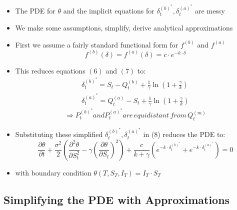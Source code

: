 \documentclass[10pt]{article}
\begin{document}
\begin{itemize} 
    \item The PDE for $\theta$ and the implicit equations for $\delta_{t}^{(b)^{*}}, \delta_{t}^{(a)^{*}}$ are messy
    \item We make some assumptions, simplify, derive analytical approximations
    \item First we assume a fairly standard functional form for $f^{(b)}$ and $f^{(a)}$
    $$
    f^{(b)}(\delta)=f^{(a)}(\delta)=c \cdot e^{-k \cdot \delta}
    $$
    \item This reduces equations $(6)$ and $(7)$ to:
    \[
    \begin{array}{l}
    \delta_{t}^{(b)^{*}}=S_{t}-Q_{t}^{(b)}+\frac{1}{\gamma} \ln \left(1+\frac{\gamma}{k}\right) \tag{11,12} \\
    \delta_{t}^{(a)^{*}}=Q_{t}^{(a)}-S_{t}+\frac{1}{\gamma} \ln \left(1+\frac{\gamma}{k}\right)
    \end{array}
    \]
    $$
    \Rightarrow P_{t}^{(b)^{*}} and P_{t}^{(a)^{*}} are\, equidistant\, from\, Q_{t}^{(m)}
    $$
    \item Substituting these simplified $\delta_{t}^{(b)^{*}}, \delta_{t}^{(a)^{*}}$ in (8) reduces the PDE to:
    \[
    \frac{\partial \theta}{\partial t}+\frac{\sigma^{2}}{2}\left(\frac{\partial^{2} \theta}{\partial S_{t}^{2}}-\gamma\left(\frac{\partial \theta}{\partial S_{t}}\right)^{2}\right)+\frac{c}{k+\gamma}\left(e^{-k \cdot \delta_{t}^{(b)^{*}}}+e^{-k \cdot \delta_{t}^{(a)^{*}}}\right)=0 \tag{13}
    \]
    \item with boundary condition $\theta\left(T, S_{T}, I_{T}\right)=I_{T} \cdot S_{T}$
\end{itemize}

\subsection{Simplifying the PDE with Approximations}
\end{document}

